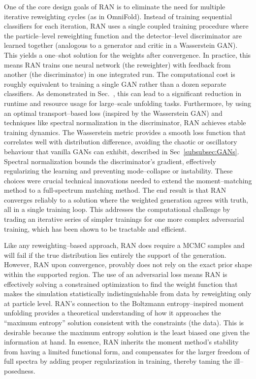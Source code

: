         One of the core design goals of RAN is to eliminate the need for multiple iterative reweighting cycles (as in OmniFold).
        Instead of training sequential classifiers for each iteration, RAN uses a single coupled training procedure where the particle--level reweighting function and the detector--level discriminator are learned together (analogous to a generator and critic in a Wasserstein GAN).
        This yields a one--shot solution for the weights after convergence.
        In practice, this means RAN trains one neural network (the reweighter) with feedback from another (the discriminator) in one integrated run.
        The computational cost is roughly equivalent to training a single GAN rather than a dozen separate classifiers.
        As demonstrated in Sec.~, this can lead to a significant reduction in runtime and resource usage for large--scale unfolding tasks.
        Furthermore, by using an optimal transport--based loss (inspired by the Wasserstein GAN) and techniques like spectral normalization in the discriminator, RAN achieves stable training dynamics.
        The Wasserstein metric provides a smooth loss function that correlates well with distribution difference, avoiding the chaotic or oscillatory behaviour that vanilla GANs can exhibit, described in Sec~\ref{subsubsec:GANs}.
        Spectral normalization bounds the discriminator’s gradient, effectively regularizing the learning and preventing mode--collapse or instability.
        These choices were crucial technical innovations needed to extend the moment--matching method to a full-spectrum matching method.
        The end result is that RAN converges reliably to a solution where the weighted generation agrees with truth, all in a single training loop.
        This addresses the computational challenge by trading an iterative series of simpler trainings for one more complex adversarial training, which has been shown to be tractable and efficient.

        Like any reweighting--based approach, RAN does require a MCMC samples and will fail if the true distribution lies entirely the support of the generation.
        However, RAN upon convergence, provably does not rely on the exact prior shape within the supported region.
        The use of an adversarial loss means RAN is effectively solving a constrained optimization to find the weight function that makes the simulation statistically indistinguishable from data by reweighting only at particle level.
        RAN’s connection to the Boltzmann entropy--inspired moment unfolding provides a theoretical understanding of how it approaches the “maximum entropy” solution consistent with the constraints (the data).
        This is desirable because the maximum entropy solution is the least biased one given the information at hand.
        In essence, RAN inherits the moment method’s stability from having a limited functional form, and compensates for the larger freedom of full spectra by adding proper regularization in training, thereby taming the ill--posedness.

